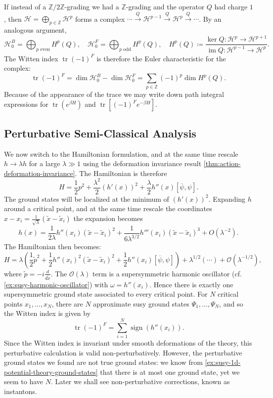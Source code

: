 \documentclass{report}
\theoremstyle{plain}
\theoremstyle{definition}
\theoremstyle{remark}
\newcommand{\bZ}{\mathbb{Z}}
\newcommand{\cH}{\mathcal{H}}
\DeclareMathOperator{\im}{im}
\DeclareMathOperator{\tr}{tr}
\newcommand{\mc}{\mathcal}
\newcommand{\cnj}{\overline}
\newcommand{\lam}{\lambda}
\newcommand{\om}{\omega}
\newcommand{\FR}[2]{\frac{#1}{#2}}
\DeclareMathOperator{\Tr}{tr}
\DeclareMathOperator{\sign}{sign}
\begin{document}
If instead of a $\bZ/2\bZ$-grading we had a $\bZ$-grading and the
operator $Q$ had charge $1$, then $\cH = \bigoplus_{p \in \bZ} \cH^p$
forms a complex $\cdots \xrightarrow{Q} \cH^{p-1} \xrightarrow{Q}
\cH^p \xrightarrow{Q} \cdots$. By an analogous argument,
\[ \cH_0^B = \bigoplus_{p \text{ even}} H^p(Q), \quad \cH_0^F = \bigoplus_{p \text{ odd}} H^p(Q), \quad H^p(Q) \coloneqq \frac{\ker Q\colon \cH^p \to \cH^{p+1}}{\im Q\colon \cH^{p-1} \to \cH^p}. \]
The Witten index $\Tr(-1)^F$ is therefore the Euler characteristic for
the complex:
\[ \tr (-1)^F = \dim \cH_0^B - \dim \cH_0^F = \sum_{p \in \bZ} (-1)^p \dim H^p(Q). \]
Because of the appearance of the trace we may write down path integral
expressions for $\Tr(e^{\beta H})$ and $\Tr\left[ (-1)^Fe^{-\beta H}
  \right]$. 

\subsection{Perturbative Semi-Classical Analysis}
\label{sec:1d-susy-potential-theory}
We now switch to the Hamiltonian formulation, and at the same time
rescale $h\to \lam h$ for a large $\lam \gg 1$ using the deformation
invariance result \ref{thm:action-deformation-invariance}. The
Hamiltonian is therefore
\[H=\FR{1}{2}p^2+\FR{\lam^2}{2}(h'(x))^2+\FR{\lam}{2}h''(x)[\cnj\psi,\psi].\]
The ground states will be localized at the minimum of $(h'(x))^2$.
Expanding $h$ around a critical point, and at the same time rescale
the coordinates $x-x_i = \FR{1}{\sqrt\lam}(\tilde x-\tilde x_i)$ the
expansion becomes \[h(x) = \FR{1}{2\lam}h''(x_i)(\tilde x-\tilde
x_i)^2+\FR{1}{6\lam^{3/2}}h'''(x_i)(\tilde x-\tilde x_i)^3 +
O(\lam^{-2}).\] The Hamiltonian then becomes:
\[ H = \lam\left( \FR{1}{2}\tilde p^2 + \FR{1}{2}h''(x_i)^2(\tilde x-\tilde x_i)^2+\FR{1}{2}h''(x_i)\left[ \cnj\psi,\psi \right]\right)+\lam^{1/2}(\cdots)+\mc O(\lam^{-1/2}),\]
where $\tilde p = -i\FR{d}{d\tilde x}$. The $\mc O(\lam)$ term is a
supersymmetric harmonic oscillator (cf.
\ref{ex:susy-harmonic-oscillator}) with $\om=h''(x_i)$. Hence there is
exactly one supersymmetric ground state associated to every critical
point. For $N$ critical points $x_1, \ldots, x_N$, there are $N$
approximate susy ground states $\Psi_1, \ldots, \Psi_N$, and so the
Witten index is given by
\[\Tr(-1)^F = \sum_{i=1}^N \sign(h''(x_i)).\]
Since the Witten index is invariant under smooth deformations of the
theory, this perturbative calculation is valid non-perturbatively.
However, the perturbative ground states we found are not true ground
states: we know from \ref{ex:susy-1d-potential-theory-ground-states}
that there is at most one ground state, yet we seem to have $N$. Later
we shall see non-perturbative corrections, known as instantons.
\end{document}
